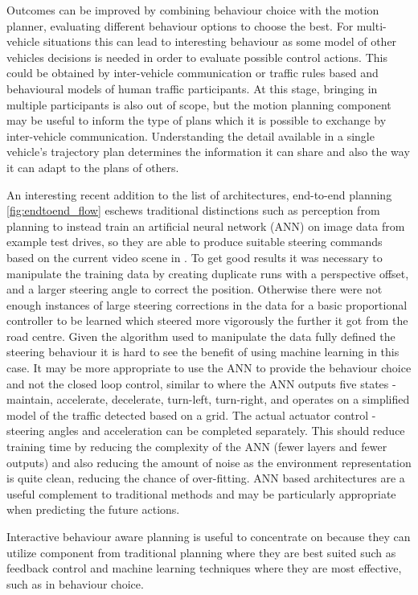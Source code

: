 Outcomes can be improved by combining behaviour choice with the motion planner, evaluating different behaviour options to choose the best. For multi-vehicle situations this can lead to interesting behaviour as some model of other vehicles decisions is needed in order to evaluate possible control actions. This could be obtained by inter-vehicle communication or traffic rules based and behavioural models of human traffic participants. At this stage, bringing in multiple participants is also out of scope, but the motion planning component may be useful to inform the type of plans which it is possible to exchange by inter-vehicle communication. Understanding the detail available in a single vehicle's trajectory plan determines the information it can share and also the way it can adapt to the plans of others.

An interesting recent addition to the list of architectures, end-to-end planning \ref{fig:endtoend_flow} eschews traditional distinctions such as perception from planning to instead train an artificial neural network (ANN) on image data from example test drives, so they are able to produce suitable steering commands based on the current video scene in \cite{Chi2017}. To get good results it was necessary to manipulate the training data by creating duplicate runs with a perspective offset, and a larger steering angle to correct the position. Otherwise there were not enough instances of large steering corrections in the data for a basic proportional controller to be learned which steered more vigorously the further it got from the road centre. Given the algorithm used to manipulate the data fully defined the steering behaviour it is hard to see the benefit of using machine learning in this case. It may be more appropriate to use the ANN to provide the behaviour choice and not the closed loop control, similar to \cite{You2019} where the ANN outputs five states - maintain, accelerate, decelerate, turn-left, turn-right, and operates on a simplified model of the traffic detected based on a grid. The actual actuator control - steering angles and acceleration can be completed separately. This should reduce training time by reducing the complexity of the ANN (fewer layers and fewer outputs) and also reducing the amount of noise as the environment representation is quite clean, reducing the chance of over-fitting. ANN based architectures are a useful complement to traditional methods and may be particularly appropriate when predicting the future actions.

Interactive behaviour aware planning is useful to concentrate on because they can utilize component from traditional planning where they are best suited such as feedback control and machine learning techniques where they are most effective, such as in behaviour choice. 

